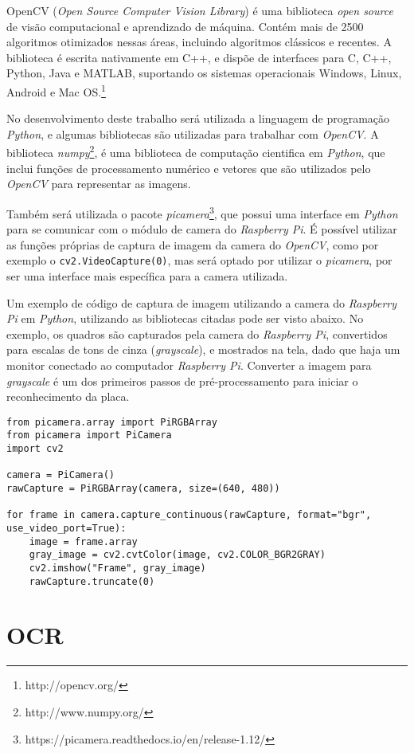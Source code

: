 OpenCV (\emph{Open Source Computer Vision Library}) é uma biblioteca \emph{open
source} de visão computacional e aprendizado de máquina. Contém mais de 2500
algoritmos otimizados nessas áreas, incluindo algoritmos clássicos e recentes. A
biblioteca é escrita nativamente em C++, e dispõe de interfaces para C, C++,
Python, Java e MATLAB, suportando os sistemas operacionais Windows, Linux,
Android e Mac OS.\footnote{http://opencv.org/}

No desenvolvimento deste trabalho será utilizada a linguagem de programação \emph{Python},
e algumas bibliotecas são utilizadas para trabalhar com \emph{OpenCV}. A biblioteca
\emph{numpy}\footnote{http://www.numpy.org/}, é uma biblioteca de computação cientifica em
\emph{Python}, que inclui funções de processamento numérico e vetores que são utilizados
pelo \emph{OpenCV} para representar as imagens.

Também será utilizada o pacote \emph{picamera}\footnote{https://picamera.readthedocs.io/en/release-1.12/},
que possui uma interface em \emph{Python} para se comunicar com o módulo de camera do \emph{Raspberry Pi}.
É possível utilizar as funções próprias de captura de imagem da camera do \emph{OpenCV}, como por exemplo
o \texttt{cv2.VideoCapture(0)}, mas será optado por utilizar o \emph{picamera}, por ser uma interface mais
específica para a camera utilizada.

Um exemplo de código de captura de imagem utilizando a camera do \emph{Raspberry Pi} em \emph{Python}, utilizando
as bibliotecas citadas pode ser visto abaixo. No exemplo, os quadros são capturados pela camera do \emph{Raspberry Pi},
convertidos para escalas de tons de cinza (\emph{grayscale}), e mostrados na tela, dado que haja um monitor conectado ao
computador \emph{Raspberry Pi}. Converter a imagem para \emph{grayscale} é um dos primeiros passos de pré-processamento
para iniciar o reconhecimento da placa.

\begin{verbatim}
from picamera.array import PiRGBArray
from picamera import PiCamera
import cv2

camera = PiCamera()
rawCapture = PiRGBArray(camera, size=(640, 480))

for frame in camera.capture_continuous(rawCapture, format="bgr", use_video_port=True):
	image = frame.array
	gray_image = cv2.cvtColor(image, cv2.COLOR_BGR2GRAY)
	cv2.imshow("Frame", gray_image)
	rawCapture.truncate(0)
\end{verbatim}


\section{OCR}
\label{sec:ocr}

